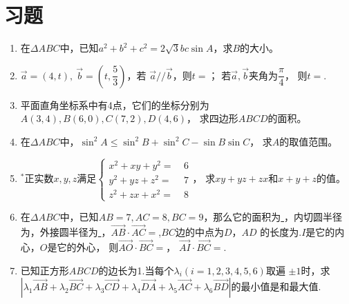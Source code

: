 \section{习题}
\begin{enumerate}[label={\textbf{\arabic*.}},leftmargin=
    \inteval{\myenumleftmargin}pt]
\item 在$ \Delta ABC $中，已知$ a^2+b^2+c^2=2\sqrt{3}bc\sin A $，求$ B $的大小。

\item $ \vec{a}=(4,t),\ \vec{b}=\left(t,\dfrac{5}{3}\right) $，若
$ \vec{a}//\vec{b} $，则$ t= $\underline{\hspace{2cm}}；
若$ \vec{a},\vec{b} $夹角为$ \dfrac{\pi}{4} $，
则$ t= $\underline{\hspace{2cm}}.

\item 平面直角坐标系中有4点，它们的坐标分别为$ A(3,4),B(6,0),C(7,2),D(4,6) $，
求四边形$ ABCD $的面积。

\item 在$ \Delta ABC $中，$ \sin^2A\leq\sin^2B+\sin^2C-\sin B\sin C $，
求$ A $的取值范围。\\

\item $ ^* $正实数$ x,y,z $满足$ \left\{ \begin{aligned} x^2+xy+y^2 =&\ 6 \\
    y^2+yz+z^2=&\ 7  \\
    z^2+zx+x^2=&\ 8  \end{aligned} \right. $，
求$ xy+yz+zx $和$ x+y+z $的值。

\item 在$ \Delta ABC $中，已知$ AB=7,AC=8,BC=9 $，那么它的面积为\underline{
    \hspace{1cm}}，内切圆半径为\underline{\hspace{1cm}}，外接圆半径为\underline{
    \hspace{1cm}}，$ \vec{AB}\cdot \vec{AC}
=$\underline{\hspace{1cm}},$ BC $边的中点为$ D $，$ AD $
的长度为\underline{\hspace{1cm}}.$ I $是它的内心，$ O $是它的外心，
则$ \vec{AO}\cdot\vec{BC} = $\underline{\hspace{2cm}}，
$ \vec{AI}\cdot\vec{BC}= $\underline{\hspace{2cm}}.

\item 已知正方形$ ABCD $的边长为1.当每个$ \lambda_i(i=1,2,3,4,5,6) $取遍
$ \pm 1 $时，求\\ $|\lambda_1\vec{AB}+\lambda_2\vec{BC}+\lambda_3
\vec{CD}+\lambda_4\vec{DA}+\lambda_5 \vec{AC}+\lambda_6\vec{BD}| 
$的最小值是和最大值.


\end{enumerate}
